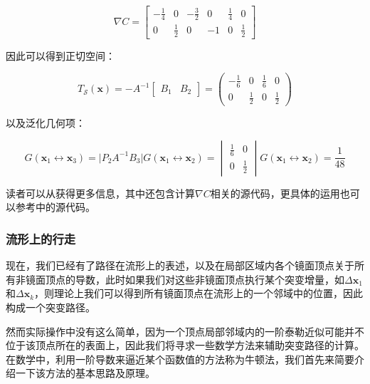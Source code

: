 \begin{equation}
	\nabla C=\begin{bmatrix}
		-\frac{1}{4} & 0           & -\frac{3}{2} & 0  & \frac{1}{4} & 0 \\
		           0 & \frac{1}{2} & 0            & -1 & 0           & \frac{1}{2}
	\end{bmatrix}
\end{equation}

\noindent 因此可以得到正切空间：

\begin{equation}
	T_{\mathcal{S}}({\mathbf{x}})=-A^{-1}\begin{bmatrix}
		B_1 & B_2
	\end{bmatrix}=\begin{pmatrix}
		-\frac{1}{6} & 0 & \frac{1}{6} & 0\\
		0 & \frac{1}{2} & 0 &\frac{1}{2}
	\end{pmatrix}
\end{equation}

\noindent 以及泛化几何项：

\begin{equation}
	G(\mathbf{x}_1\leftrightarrow\mathbf{x}_3)=\bigg| P_2A^{-1}B_3\bigg|	G(\mathbf{x}_1\leftrightarrow\mathbf{x}_2)=\begin{vmatrix}
		\frac{1}{6} & 0\\
		0 & \frac{1}{2}	
	\end{vmatrix}G(\mathbf{x}_1\leftrightarrow\mathbf{x}_2)=\frac{1}{48}
\end{equation}

读者可以从\cite{a:LIGHTTRANSPORTONPATHSPACEMANIFOLDS,a:ManifoldExplorationExpanded}获得更多信息，其中还包含计算$\nabla C$相关的源代码，更具体的运用也可以参考\cite{m:MitsubaRenderer}中的源代码。





\subsubsection{流形上的行走}\label{sec:mlt-manifold-move}
现在，我们已经有了路径在流形上的表述，以及在局部区域内各个镜面顶点关于所有非镜面顶点的导数，此时如果我们对这些非镜面顶点执行某个突变增量，如$\Delta \mathbf{x}_1$和$\Delta \mathbf{x}_k$，则理论上我们可以得到所有镜面顶点在流形上的一个邻域中的位置，因此构成一个突变路径。

然而实际操作中没有这么简单，因为一个顶点局部邻域内的一阶泰勒近似可能并不位于该顶点所在的表面上，因此我们将寻求一些数学方法来辅助突变路径的计算。在数学中，利用一阶导数来逼近某个函数值的方法称为牛顿法，我们首先来简要介绍一下该方法的基本思路及原理。



